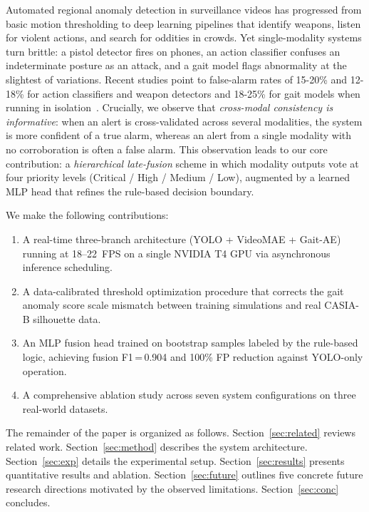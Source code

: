 \documentclass[conference]{IEEEtran}
\begin{document}
Automated regional anomaly detection in surveillance videos has progressed from
basic motion thresholding to deep learning pipelines that identify weapons,
listen for violent actions, and search for oddities in crowds. Yet
single-modality systems turn brittle: a pistol detector fires on phones,
an action classifier confuses an indeterminate posture as an attack, and a
gait model flags abnormality at the slightest of variations. Recent studies
point to false-alarm rates of 15-20\% and 12-18\% for action classifiers and
weapon detectors and 18-25\% for gait models when running in isolation~\cite{srilakshmi2025}.
Crucially, we observe that \emph{cross-modal consistency is informative}:
when an alert is cross-validated across several modalities, the system is more
confident of a true alarm, whereas an alert from a single modality with no
corroboration is often a false alarm.
This observation leads to our core contribution: a \emph{hierarchical
late-fusion} scheme in which modality outputs vote at four priority levels
(Critical / High / Medium / Low), augmented by a learned MLP head that
refines the rule-based decision boundary.

We make the following contributions:
\begin{enumerate}
  \item A real-time three-branch architecture (YOLO + VideoMAE + Gait-AE)
        running at 18--22\, FPS on a single NVIDIA T4 GPU via asynchronous
        inference scheduling.
  \item A data-calibrated threshold optimization procedure that corrects the
        gait anomaly score scale mismatch between training simulations and
        real CASIA-B silhouette data.
  \item An MLP fusion head trained on bootstrap samples labeled by the
        rule-based logic, achieving fusion F1\,=\,0.904 and 100\% FP
        reduction against YOLO-only operation.
  \item A comprehensive ablation study across seven system configurations
        on three real-world datasets.
\end{enumerate}

The remainder of the paper is organized as follows.
Section~\ref{sec:related} reviews related work.
Section~\ref{sec:method} describes the system architecture.
Section~\ref{sec:exp} details the experimental setup.
Section~\ref{sec:results} presents quantitative results and ablation.
Section~\ref{sec:future} outlines five concrete future research
directions motivated by the observed limitations.
Section~\ref{sec:conc} concludes.
\end{document}

